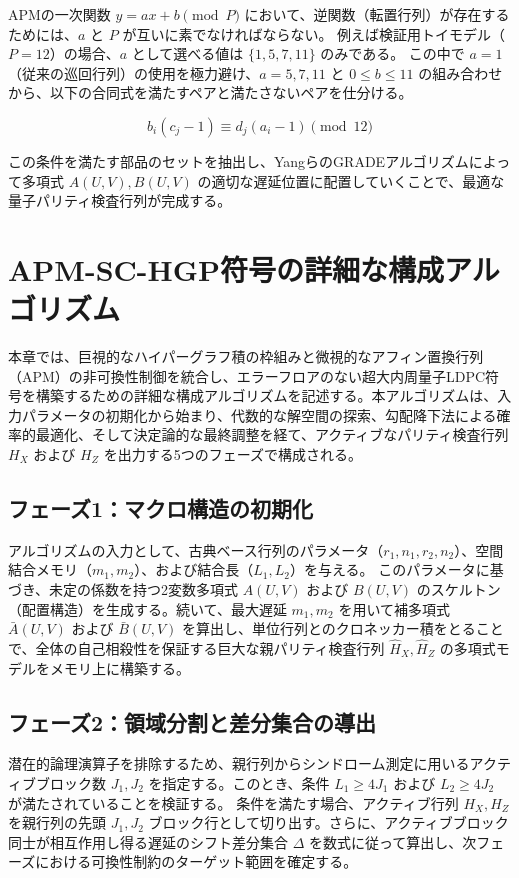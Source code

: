 \documentclass[12pt]{article}
\begin{document}
APMの一次関数 $y = ax + b \pmod P$ において、逆関数（転置行列）が存在するためには、$a$ と $P$ が互いに素でなければならない。
例えば検証用トイモデル（$P=12$）の場合、$a$ として選べる値は $\{1, 5, 7, 11\}$ のみである。
この中で $a=1$ （従来の巡回行列）の使用を極力避け、$a=5, 7, 11$ と $0 \le b \le 11$ の組み合わせから、以下の合同式を満たすペアと満たさないペアを仕分ける。

$$b_i (c_j - 1) \equiv d_j (a_i - 1) \pmod{12}$$

この条件を満たす部品のセットを抽出し、YangらのGRADEアルゴリズムによって多項式 $A(U,V), B(U,V)$ の適切な遅延位置に配置していくことで、最適な量子パリティ検査行列が完成する。

\section{APM-SC-HGP符号の詳細な構成アルゴリズム}

本章では、巨視的なハイパーグラフ積の枠組みと微視的なアフィン置換行列（APM）の非可換性制御を統合し、エラーフロアのない超大内周量子LDPC符号を構築するための詳細な構成アルゴリズムを記述する。本アルゴリズムは、入力パラメータの初期化から始まり、代数的な解空間の探索、勾配降下法による確率的最適化、そして決定論的な最終調整を経て、アクティブなパリティ検査行列 $H_X$ および $H_Z$ を出力する5つのフェーズで構成される。

\subsection{フェーズ1：マクロ構造の初期化}
アルゴリズムの入力として、古典ベース行列のパラメータ（$r_1, n_1, r_2, n_2$）、空間結合メモリ（$m_1, m_2$）、および結合長（$L_1, L_2$）を与える。
このパラメータに基づき、未定の係数を持つ2変数多項式 $A(U,V)$ および $B(U,V)$ のスケルトン（配置構造）を生成する。続いて、最大遅延 $m_1, m_2$ を用いて補多項式 $\bar{A}(U,V)$ および $\bar{B}(U,V)$ を算出し、単位行列とのクロネッカー積をとることで、全体の自己相殺性を保証する巨大な親パリティ検査行列 $\hat{H}_X, \hat{H}_Z$ の多項式モデルをメモリ上に構築する。

\subsection{フェーズ2：領域分割と差分集合の導出}
潜在的論理演算子を排除するため、親行列からシンドローム測定に用いるアクティブブロック数 $J_1, J_2$ を指定する。このとき、条件 $L_1 \ge 4J_1$ および $L_2 \ge 4J_2$ が満たされていることを検証する。
条件を満たす場合、アクティブ行列 $H_X, H_Z$ を親行列の先頭 $J_1, J_2$ ブロック行として切り出す。さらに、アクティブブロック同士が相互作用し得る遅延のシフト差分集合 $\Delta$ を数式に従って算出し、次フェーズにおける可換性制約のターゲット範囲を確定する。
\end{document}
